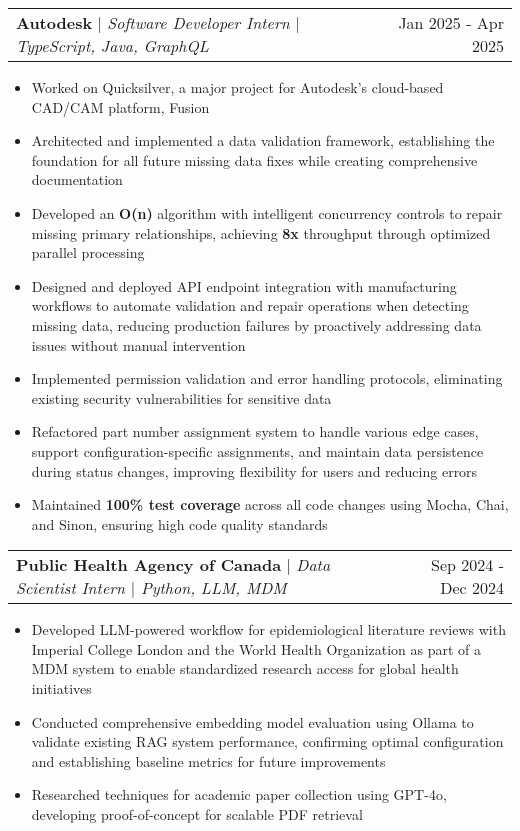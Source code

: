 \documentclass[letterpaper,10pt]{article}
\makeatletter
\newcommand{\resumeItem}[1]{
  \item\small{
    {#1 \vspace{-4pt}}
  }
}
\newcommand{\resumeSubheading}[3]{
    \item
    \begin{tabular*}{0.97\textwidth}[t]{l@{\extracolsep{\fill}}r}
      \textbf{#1} $|$ \textit{ #2} & #3 \\
    \end{tabular*}\vspace{-6pt}
}
\newcommand{\resumeItemListStart}{\begin{itemize}}
\newcommand{\resumeItemListEnd}{\end{itemize}\vspace{-5pt}}
\makeatother
\begin{document}
    \resumeSubheading{Autodesk}{Software Developer Intern $|$ TypeScript, Java, GraphQL}{Jan 2025 - Apr 2025}
        \resumeItemListStart
            \resumeItem{Worked on Quicksilver, a major project for Autodesk's cloud-based CAD/CAM platform, Fusion}
            \resumeItem{Architected and implemented a data validation framework, establishing the foundation for all future missing data fixes while creating comprehensive documentation}
            \resumeItem{Developed an \textbf{O(n)} algorithm with intelligent concurrency controls to repair missing primary relationships, achieving \textbf{8x} throughput through optimized parallel processing}
            \resumeItem{Designed and deployed API endpoint integration with manufacturing workflows to automate validation and repair operations when detecting missing data, reducing production failures by proactively addressing data issues without manual intervention}
            \resumeItem{Implemented permission validation and error handling protocols, eliminating existing security vulnerabilities for sensitive data}
            \resumeItem{Refactored part number assignment system to handle various edge cases, support configuration-specific assignments, and maintain data persistence during status changes, improving flexibility for users and reducing errors}
            \resumeItem{Maintained \textbf{100\% test coverage} across all code changes using Mocha, Chai, and Sinon, ensuring high code quality standards}
        \resumeItemListEnd

    \resumeSubheading{Public Health Agency of Canada}{Data Scientist Intern $|$ Python, LLM, MDM}{Sep 2024 - Dec 2024}
      \resumeItemListStart
        \resumeItem{Developed LLM-powered workflow for epidemiological literature reviews with Imperial College London and the World Health Organization as part of a MDM system to enable standardized research access for global health initiatives}
        \resumeItem{Conducted comprehensive embedding model evaluation using Ollama to validate existing RAG system performance, confirming optimal configuration and establishing baseline metrics for future improvements}
        \resumeItem{Researched techniques for academic paper collection using GPT-4o, developing proof-of-concept for scalable PDF retrieval}
      \resumeItemListEnd
\end{document}
